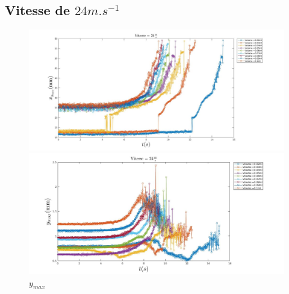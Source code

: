 \documentclass[french]{article}
\begin{document}
\subsection{Vitesse de $24m.s^{-1}$}

\begin{figure}[!h]
	\centering
	\begin{minipage}{0.95\linewidth}
	\includegraphics[width = \linewidth]{./image/v=24xm.jpg}
	\caption{$x_{max}$}
	\end{minipage}
	\begin{minipage}{0.95\linewidth}
	\includegraphics[width = \linewidth]{./image/v=24ym.jpg}
	\caption{$y_{max}$}
	\end{minipage}
\end{figure}
\end{document}

